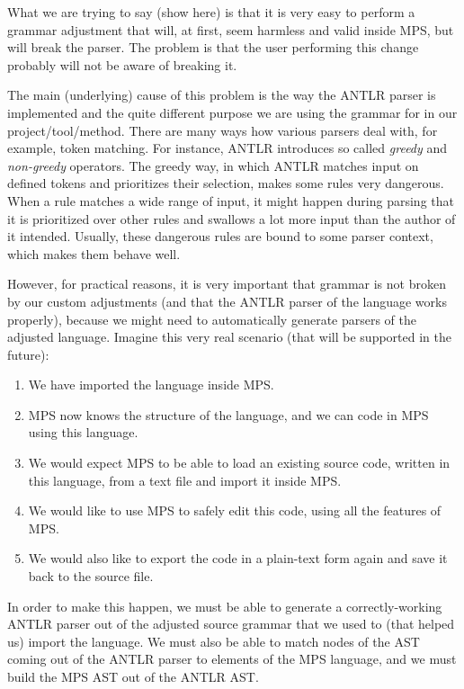What we are trying to say (show here) is that it is very easy to perform a grammar adjustment that will, at first, seem harmless and valid inside MPS, but will break the parser.
The problem is that the user performing this change probably will not be aware of breaking it.

The main (underlying) cause of this problem is the way the ANTLR parser is implemented and the quite different purpose we are using the grammar for in our project/tool/method.
There are many ways how various parsers deal with, for example, token matching.
For instance, ANTLR introduces so called \emph{greedy} and \emph{non-greedy} operators.
The greedy way, in which ANTLR matches input on defined tokens and prioritizes their selection, makes some rules very dangerous.
When a rule matches a wide range of input, it might happen during parsing that it is prioritized over other rules and swallows a lot more input than the author of it intended.
Usually, these dangerous rules are bound to some parser context, which makes them behave well.

However, for practical reasons, it is very important that grammar is not broken by our custom adjustments (and that the ANTLR parser of the language works properly), because we might need to automatically generate parsers of the adjusted language.
Imagine this very real scenario (that will be supported in the future):
\begin{enumerate}
	\item We have imported the language inside MPS.
	\item MPS now knows the structure of the language, and we can code in MPS using this language.
	\item We would expect MPS to be able to load an existing source code, written in this language, from a text file and import it inside MPS.
	\item We would like to use MPS to safely edit this code, using all the features of MPS.
	\item We would also like to export the code in a plain-text form again and save it back to the source file.
\end{enumerate}
In order to make this happen, we must be able to generate a correctly-working ANTLR parser out of the adjusted source grammar that we used to (that helped us) import the language.
We must also be able to match nodes of the AST coming out of the ANTLR parser to elements of the MPS language, and we must build the MPS AST out of the ANTLR AST.
